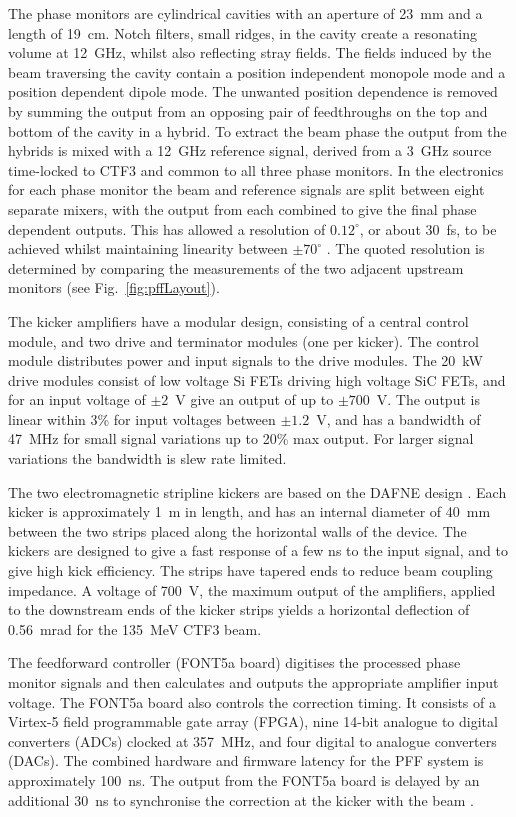 \documentclass[%
 reprint,
superscriptaddress,
 amsmath,amssymb,
 prl,
]{revtex4-1}
\begin{document}
The phase monitors \cite{phMonEuCard} are cylindrical cavities with an aperture 
of 23~mm and a length of 19~cm. Notch filters, small ridges, in the cavity 
create a resonating volume at 12~GHz, whilst also reflecting stray fields.
The fields induced by the beam traversing the cavity contain a position 
independent monopole mode and a position dependent dipole mode. The unwanted 
position dependence is removed by summing the output from an opposing pair 
of feedthroughs on the top and bottom of the cavity in a hybrid. 
To extract the beam phase the output from the hybrids 
is mixed with a 12~GHz reference signal, derived from a 3~GHz source 
time-locked to CTF3 and common to all three phase monitors.
In the electronics for each phase monitor the beam and reference signals are 
split between eight separate mixers, with the output from each combined to give 
the final phase dependent outputs. This has allowed a resolution of 
\(0.12^\circ\), or about 30~fs, to be achieved whilst maintaining linearity 
between \(\pm70^\circ\) \cite{RobertsThesis}. The quoted resolution 
is determined by comparing the measurements of the two adjacent upstream 
monitors (see Fig.~\ref{fig:pffLayout}).

The kicker amplifiers \cite{RobertsThesis} have a modular design, 
consisting of a central control module, and two drive and terminator modules 
(one per kicker). The control module distributes power and input signals to the 
drive modules. The 20~kW drive modules consist of low voltage Si FETs driving 
high voltage SiC FETs, and for an input voltage of \(\pm2\)~V give an output of 
up to \(\pm700\)~V. The output is linear within 3\% for input voltages between 
\(\pm1.2\)~V, and has a bandwidth of 47~MHz for small signal variations up to 
20\% max output. For larger signal variations the bandwidth is slew rate 
limited.

The two electromagnetic stripline kickers \cite{kickerIPAC11} are based on the 
DAFNE design \cite{dafnePAC09}. Each kicker is approximately 1~m in length, and 
has an internal diameter of 40~mm between the two strips placed along the 
horizontal walls of the device. The kickers are designed to give a fast 
response of a few ns to the input signal, and to give high kick efficiency. The 
strips have tapered ends to reduce beam coupling impedance.
A voltage of 700~V, the maximum output of the amplifiers, applied to the 
downstream ends of the kicker strips yields a horizontal deflection of 
0.56~mrad for the 135~MeV CTF3 beam.

The feedforward controller (FONT5a board) digitises the processed phase monitor 
signals and then calculates and outputs the appropriate amplifier input 
voltage. The FONT5a board also controls the correction timing. It consists of a 
Virtex-5 field programmable gate array (FPGA), nine 14-bit analogue to digital 
converters (ADCs) clocked at 357~MHz, and four digital to analogue converters 
(DACs). The combined hardware and firmware latency for the PFF system is 
approximately 100~ns. The output from the FONT5a board is delayed by an 
additional 30~ns to synchronise the correction at the kicker with the beam 
\cite{RobertsThesis}.
\end{document}
